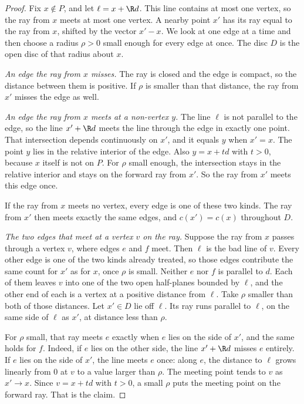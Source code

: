 \begin{proof}
Fix $x\notin P$, and let $\ell=x+\R d$. This line contains at most one vertex, so the ray from $x$ meets at most one vertex. A nearby point $x'$ has its ray equal to the ray from $x$, shifted by the vector $x'-x$. We look at one edge at a time and then choose a radius $\rho>0$ small enough for every edge at once. The disc $D$ is the open disc of that radius about $x$.

\emph{An edge the ray from $x$ misses.} The ray is closed and the edge is compact, so the distance between them is positive. If $\rho$ is smaller than that distance, the ray from $x'$ misses the edge as well.

\emph{An edge the ray from $x$ meets at a non-vertex $y$.} The line $\ell$ is not parallel to the edge, so the line $x'+\R d$ meets the line through the edge in exactly one point. That intersection depends continuously on $x'$, and it equals $y$ when $x'=x$. The point $y$ lies in the relative interior of the edge. Also $y=x+td$ with $t>0$, because $x$ itself is not on $P$. For $\rho$ small enough, the intersection stays in the relative interior and stays on the forward ray from $x'$. So the ray from $x'$ meets this edge once.

If the ray from $x$ meets no vertex, every edge is one of these two kinds. The ray from $x'$ then meets exactly the same edges, and $c(x')=c(x)$ throughout $D$.

\emph{The two edges that meet at a vertex $v$ on the ray.} Suppose the ray from $x$ passes through a vertex $v$, where edges $e$ and $f$ meet. Then $\ell$ is the bad line of $v$. Every other edge is one of the two kinds already treated, so those edges contribute the same count for $x'$ as for $x$, once $\rho$ is small. Neither $e$ nor $f$ is parallel to $d$. Each of them leaves $v$ into one of the two open half-planes bounded by $\ell$, and the other end of each is a vertex at a positive distance from $\ell$. Take $\rho$ smaller than both of those distances. Let $x'\in D$ lie off $\ell$. Its ray runs parallel to $\ell$, on the same side of $\ell$ as $x'$, at distance less than $\rho$.

For $\rho$ small, that ray meets $e$ exactly when $e$ lies on the side of $x'$, and the same holds for $f$. Indeed, if $e$ lies on the other side, the line $x'+\R d$ misses $e$ entirely. If $e$ lies on the side of $x'$, the line meets $e$ once: along $e$, the distance to $\ell$ grows linearly from $0$ at $v$ to a value larger than $\rho$. The meeting point tends to $v$ as $x'\to x$. Since $v=x+td$ with $t>0$, a small $\rho$ puts the meeting point on the forward ray. That is the claim.


\end{proof}
